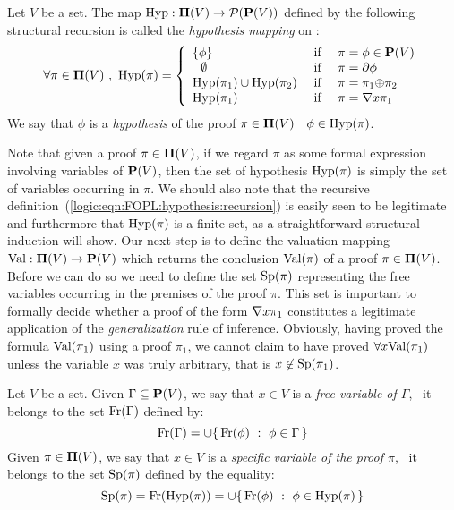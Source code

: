 \begin{defin}\label{logic:def:FOPL:hypothesis}
Let $V$ be a set. The map $\mbox{\rm Hyp}:\mbox{${\bf\Pi}(V)$}\to{\cal P}(\mbox{${\bf P}(V)$})$ defined by the
following structural recursion is called the {\em hypothesis
mapping} on \pvs:
 \begin{equation}\label{logic:eqn:FOPL:hypothesis:recursion}
    \forall\pi\in\pvs\ ,\ \hyp(\pi)=\left\{
                    \begin{array}{lcl}
                    \{\phi\}&\mbox{\ if\ }&\pi=\phi\in\pv\\
                    \ \ \emptyset&\mbox{\ if\ }&\pi=\axi\phi\\
                    \hyp(\pi_{1})\cup\hyp(\pi_{2}) &\mbox{\ if\ }&\pi=\pi_{1}\pon\pi_{2}\\
                    \hyp(\pi_{1})&\mbox{\ if\ }&\pi=\gen x\pi_{1}\\
                    \end{array}\right.
    \end{equation}
We say that $\phi$ is a {\em hypothesis} of the proof $\pi\in\mbox{${\bf\Pi}(V)$}$
\ifand\ $\phi\in\mbox{\rm Hyp}(\pi)$.
\end{defin}
Note that given a proof $\pi\in\mbox{${\bf\Pi}(V)$}$, if we regard $\pi$ as some
formal expression involving variables of $\mbox{${\bf P}(V)$}$, then the set of
hypothesis $\mbox{\rm Hyp}(\pi)$ is simply the set of variables occurring in
$\pi$. We should also note that the recursive
definition~(\ref{logic:eqn:FOPL:hypothesis:recursion}) is easily
seen to be legitimate and furthermore that $\mbox{\rm Hyp}(\pi)$ is a finite
set, as a straightforward structural induction will show. Our next
step is to define the valuation mapping $\mbox{\rm Val}:\mbox{${\bf\Pi}(V)$}\to\mbox{${\bf P}(V)$}$ which
returns the conclusion $\mbox{\rm Val}(\pi)$ of a proof $\pi\in\mbox{${\bf\Pi}(V)$}$. Before
we can do so we need to define the set $\mbox{\rm Sp}(\pi)$ representing the
free variables occurring in the premises of the proof $\pi$. This
set is important to formally decide whether a proof of the form
$\mbox{$\nabla$} x\pi_{1}$ constitutes a legitimate application of the {\em
generalization} rule of inference. Obviously, having proved the
formula $\mbox{\rm Val}(\pi_{1})$ using a proof $\pi_{1}$, we cannot claim to
have proved $\forall x\mbox{\rm Val}(\pi_{1})$ unless the variable $x$ was
truly arbitrary, that is $x\not\in\mbox{\rm Sp}(\pi_{1})$.

\begin{defin}\label{logic:def:FOPL:proof:free:variable}
Let $V$ be a set. Given $\Gamma\subseteq\mbox{${\bf P}(V)$}$, we say that $x\in V$
is a {\em free variable of $\Gamma$}, \ifand\ it belongs to the set
$\mbox{\rm Fr}(\Gamma)$ defined by:
    \[
    \mbox{\rm Fr}(\Gamma) = \cup\{\,\mbox{\rm Fr}(\phi)\ :\ \phi\in\Gamma\,\}
    \]
Given $\pi\in\mbox{${\bf\Pi}(V)$}$, we say that $x\in V$ is a {\em specific variable
of the proof $\pi$}, \ifand\ it belongs to the set $\mbox{\rm Sp}(\pi)$
defined by the equality:
    \[
    \spec(\pi) = \free(\hyp(\pi))= \cup\{\,\free(\phi)\ :\ \phi\in\hyp(\pi)\,\}
    \]
\end{defin}

